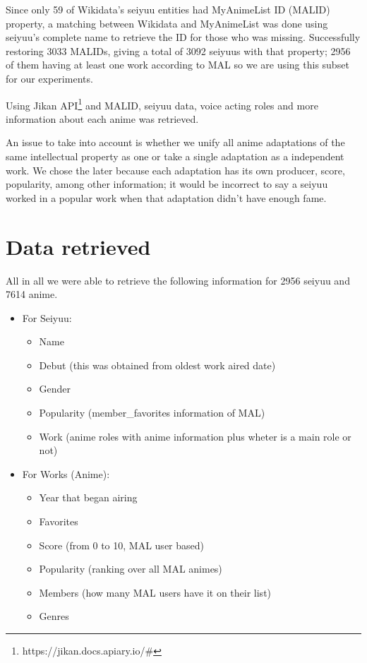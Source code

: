 Since only 59 of Wikidata's seiyuu entities had MyAnimeList ID (MALID) property, a matching between Wikidata and MyAnimeList was done using seiyuu's complete name to retrieve the ID for those who was missing. Successfully restoring 3033 MALIDs, giving a total of 3092 seiyuus with that property; 2956 of them having at least one work according to MAL so we are using this subset for our experiments.

Using Jikan API\footnote{https://jikan.docs.apiary.io/\#} and MALID, seiyuu data, voice acting roles and more information about each anime was retrieved. 

An issue to take into account is whether we unify all anime adaptations of the same intellectual property as one or take a single adaptation as a independent work. We chose the later because each adaptation has its own producer, score, popularity, among other information; it would be incorrect to say a seiyuu worked in a popular work when that adaptation didn't have enough fame.\\

\section{Data retrieved}
All in all we were able to retrieve the following information for 2956 seiyuu and 7614 anime.

\begin{itemize}
	\item For Seiyuu:
	\begin{itemize}
		\item Name
		\item Debut (this was obtained from oldest work aired date)
		\item Gender
		\item Popularity (member\_favorites information of MAL)
		\item Work (anime roles with anime information plus wheter is a main role or not)
	\end{itemize}
	\item For Works (Anime):
	\begin{itemize}
		\item Year that began airing
		\item Favorites
		\item Score (from 0 to 10, MAL user based)
		\item Popularity (ranking over all MAL animes)
		\item Members (how many MAL users have it on their list)
		\item Genres
	\end{itemize}
\end{itemize}

